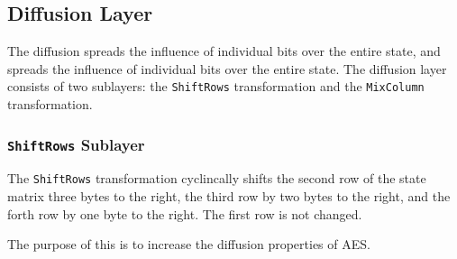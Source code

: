 \subsection{Diffusion Layer}
\label{sec:diffusion}

The diffusion spreads the influence of individual bits over the entire state, and spreads the influence of individual bits over the entire state.
The diffusion layer consists of two sublayers: the \texttt{ShiftRows} transformation and the \texttt{MixColumn} transformation.


\subsubsection{\texttt{ShiftRows} Sublayer}

The \texttt{ShiftRows} transformation cyclincally shifts the second row of the state matrix three bytes to the right, the third row by two bytes to the right, and the forth row by one byte to the right.
The first row is not changed.

The purpose of this is to increase the diffusion properties of AES.


